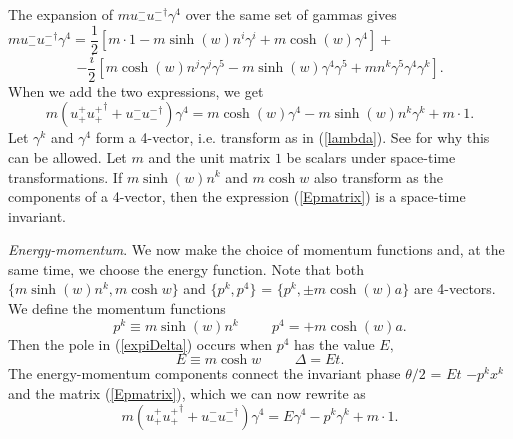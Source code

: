 \documentclass[a4paper,12pt]{article}
\begin{document}
	The expansion of $ m {u_{-}^{-}} {u_{-}^{- }}^{\dagger} \gamma^{4}$ over the same set of gammas gives
\begin{equation}	\label{u--u--g}
m u_{-}^{- } {u_{-}^{-  }}^{\dagger} \gamma^{4} = \frac{1}{2}[m \cdot 1 - m \sinh{(w)} n^{i} \gamma^{i} + m\cosh{(w)} \gamma^{4}] + \hspace{4cm}
\end{equation}
$$-\frac{i}{2}[  m\cosh{(w)} n^{j} \gamma^{j} \gamma^{5} - m \sinh{(w)}\gamma^{4} \gamma^{5} + m n^{k} \gamma^{5} \gamma^{4} \gamma^{k}].$$
When we add the two expressions, we get
\begin{equation}	\label{Epmatrix}
m ( u_{+}^{+ } {u_{+}^{+  }}^{\dagger} + u_{-}^{- } {u_{-}^{- }}^{\dagger} ) \gamma^{4} = m \cosh{(w)} \gamma^{4} - m \sinh{(w)} n^{k} \gamma^{k} + m \cdot 1  .
\end{equation}
Let $\gamma^{k}$ and $\gamma^{4}$ form a 4-vector, i.e. transform as in (\ref{lambda}). See \cite{feynman3} for why this can be allowed. Let $m$ and the unit matrix $1$ be scalars under space-time transformations. If $m \sinh{(w)} n^{k}$ and $m \cosh{w}$ also transform as the components of a 4-vector, then the expression (\ref{Epmatrix}) is a space-time invariant. 

	{\textit{Energy-momentum}}. We now make the choice of momentum functions and, at the same time, we choose the energy function. Note that both $\{m \sinh{(w)} n^{k}, m \cosh{w} \}$ and $\{p^{k}, p^{4}\}$ = $\{p^{k}, \pm m \cosh{(w)} a\}$ are 4-vectors. We define the momentum functions
\begin{equation} \label{pk}
p^{k} \equiv m \sinh{(w)} n^{k} \hspace{1cm} p^{4} = +m \cosh{(w)} a.
\end{equation}
Then the pole in (\ref{expiDelta}) occurs when $p^{4}$ has the value $E,$
\begin{equation}	\label{E}
E \equiv m \cosh{w} \hspace{1cm} \Delta = Et.
\end{equation} 
The energy-momentum components connect the invariant phase $\theta/2$ = $Et$ $-p^{k} x^{k}$ and the matrix (\ref{Epmatrix}), which we can now rewrite as
\begin{equation}	\label{Epmatrix1}
m ( u_{+}^{+ } {u_{+}^{+  }}^{\dagger} + u_{-}^{- } {u_{-}^{- }}^{\dagger} ) \gamma^{4} = E \gamma^{4} - p^{k} \gamma^{k} + m \cdot 1  .
\end{equation}
\end{document}
